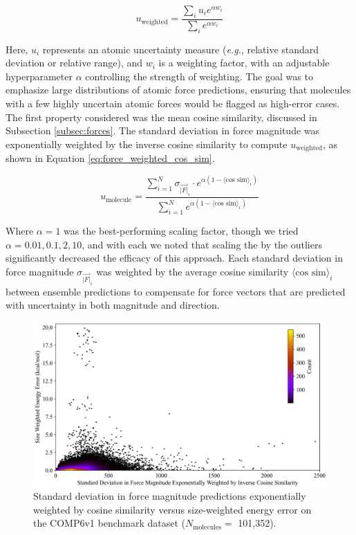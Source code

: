 \begin{equation} 
u_{\text{weighted}} = \frac{\sum_i u_i e^{\alpha w_i}}{\sum_i e^{\alpha w_i}} 
\label{eq:outliers-weighted_sum}
\end{equation}

Here, $u_i$ represents an atomic uncertainty measure (\textit{e.g.}, relative standard deviation or relative range), and $w_i$ is a weighting factor, with an adjustable hyperparameter $\alpha$ controlling the strength of weighting.
The goal was to emphasize large distributions of atomic force predictions, ensuring that molecules with a few highly uncertain atomic forces would be flagged as high-error cases.
The first property considered was the mean cosine similarity, discussed in Subsection \ref{subsec:forces}.
The standard deviation in force magnitude was exponentially weighted by the inverse cosine similarity to compute $u_{\text{weighted}}$, as shown in Equation \ref{eq:force_weighted_cos_sim}.

\begin{equation}
    u_{\text{molecule}} = \frac{\sum_{i=1}^{N} \sigma_{\vec{|F|}_i} \cdot e^{\alpha (1 - \langle \text{cos sim} \rangle_i)}}{\sum_{i=1}^{N} e^{\alpha (1 - \langle \text{cos sim} \rangle_i)}}
    \label{eq:force_weighted_cos_sim}
\end{equation}

Where $\alpha=1$ was the best-performing scaling factor, though we tried $\alpha=0.01, 0.1, 2, 10$, and with each we noted that scaling the by the outliers significantly decreased the efficacy of this approach. 
Each standard deviation in force magnitude $\sigma_{\vec{|F|}_i}$ was weighted by the average cosine similarity $\langle \text{cos sim} \rangle_i$ between ensemble predictions to compensate for force vectors that are predicted with uncertainty in both magnitude and direction.

\begin{figure}[!ht]
    \centering
    \includegraphics[width=1\linewidth]{Images/2xr_forces/cos_sim_exponential_weighting-vs-energy.png}
    \caption[Standard deviation in force magnitude predictions exponentially weighted by cosine similarity vs. energy error (COMP6v1)]{Standard deviation in force magnitude predictions exponentially weighted by cosine similarity versus size-weighted energy error on the COMP6v1 benchmark dataset ($N_\text{molecules}=$ 101,352).}
    \label{fig:cos_sim-weighted-uncertainty}
\end{figure}

